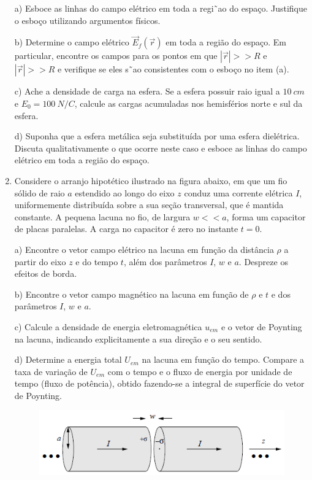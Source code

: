\begin{enumerate}[start=1,label={\bfseries Q\arabic*.}]
a) Esboce as linhas do campo elétrico em toda a regi˜ao do espaço. Justifique o esboço utilizando argumentos físicos.

\resposta

b) Determine o campo elétrico $\vec{E}_{f} (\vec{r})$ em toda a região do espaço. Em particular, encontre os campos para os pontos em que $|\vec{r}| >> R$ e $|\vec{r}| >> R$ e verifique se eles s˜ao consistentes com o esboço no item (a).

\resposta

c) Ache a densidade de carga na esfera. Se a esfera possuir raio igual a $10 \ cm$ e $E_{0} = 100 \ N/C$, calcule as cargas acumuladas nos hemisférios norte e sul da esfera.

\resposta

d) Suponha que a esfera metálica seja substituída por uma esfera dielétrica. Discuta qualitativamente o que ocorre neste caso e esboce as linhas do campo elétrico em toda a região do espaço.

\resposta

\item Considere o arranjo hipotético ilustrado na figura abaixo, em que um fio sólido de raio $a$ estendido ao longo do eixo $z$ conduz uma corrente elétrica $I$, uniformemente distribuída sobre a sua seção transversal, que é mantida constante. A pequena lacuna no fio, de largura $w << a$, forma um capacitor de placas paralelas. A carga no capacitor é zero no instante $t = 0$.

a) Encontre o vetor campo elétrico na lacuna em função da distância $\rho$ a partir do eixo $z$ e do tempo $t$, além dos parâmetros $I$, $w$ e $a$. Despreze os efeitos de borda.

\resposta

b) Encontre o vetor campo magnético na lacuna em função de $\rho$ e $t$ e dos parâmetros $I$, $w$ e $a$.

\resposta

c) Calcule a densidade de energia eletromagnética $u_{em}$ e o vetor de Poynting na lacuna, indicando explicitamente a sua direção e o seu sentido.

\resposta

d) Determine a energia total $U_{em}$ na lacuna em função do tempo. Compare a taxa de variação de $U_{em}$ com o tempo e o fluxo de energia por unidade de tempo (fluxo de potência), obtido fazendo-se a integral de superfície do vetor de Poynting.

\begin{figure}[H]
\centering
\includegraphics[scale=0.8]{eletromag-img/solido.png}
\end{figure}


\end{enumerate}
